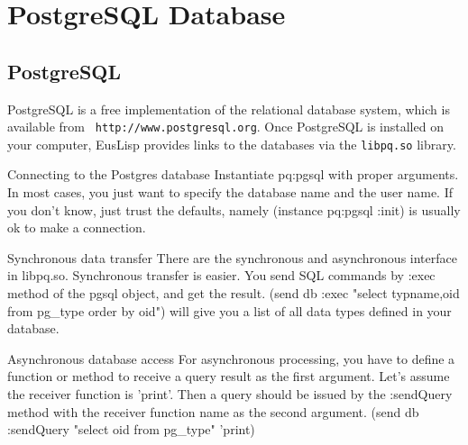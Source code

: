 \section{PostgreSQL Database}

\subsection{PostgreSQL}

PostgreSQL is a free implementation of the relational database system,
which is available from \verb+ http://www.postgresql.org+.
Once PostgreSQL is installed on your computer, EusLisp provides
links to the databases via the {\tt libpq.so} library.


\begin{description}
\item{Connecting to the Postgres database}
	Instantiate pq:pgsql with proper arguments.  In most cases,
	you just want to specify the database name and the user name.
	If you don't know, just trust the defaults, namely
	(instance pq:pgsql :init) is usually ok to make a connection.

\item{Synchronous data transfer}
	There are the synchronous and asynchronous interface in libpq.so.
	Synchronous transfer is easier.  You send SQL commands by
	:exec method of the pgsql object, and get the result.
	(send db :exec "select typname,oid from pg\_type order by oid")
	will give you a list of all data types defined in your database.

\item{Asynchronous database access}
	For asynchronous processing, you have to define a function or
	method to receive a query result as the first argument. Let's 
	assume the receiver function is 'print'.  Then a query should be
	issued by the :sendQuery method with the receiver function name
	as the second argument.
	(send db :sendQuery "select oid from pg\_type" 'print)


\end{description}
